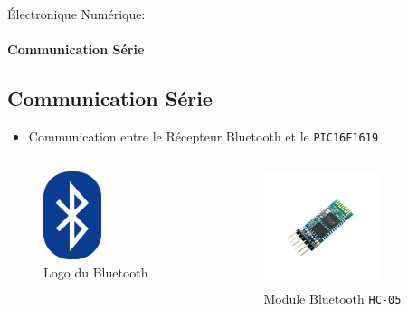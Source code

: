 \documentclass{beamer}
\begin{document}
	\begin{frame}{Électronique Numérique:}
		\framesubtitle{Communication Série}
		\subsection[Série]{Communication Série}
		\begin{itemize}
		    \item Communication entre le Récepteur Bluetooth et le \texttt{PIC16F1619}
		\end{itemize}
		\begin{columns}[T]
	  		\begin{column}{0.5\textwidth}
		    	\begin{figure}
		    		\includegraphics[width=0.45\textwidth]{../Illus/BluetoothLogo.png}
	    			\caption{Logo du Bluetooth}
	    		 \end{figure}
	  		\end{column}
	  		\begin{column}{0.5\textwidth}
	  			\begin{figure}
	    			\hspace*{2em}\includegraphics[width=0.7\textwidth]{../Illus/HC05.png}
	    			\caption{Module Bluetooth \texttt{HC-05}}
	    		\end{figure}
	  		\end{column}
	  	\end{columns}
	\end{frame}
\end{document}
